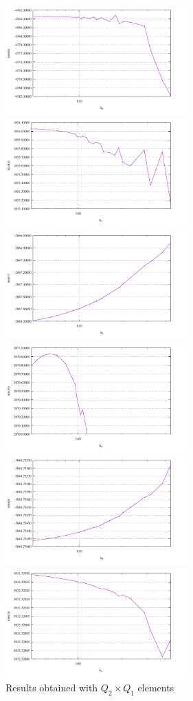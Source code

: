 \begin{center}
\includegraphics[width=7cm]{python_codes/fieldstone_25/results/min_u_001.pdf}
\includegraphics[width=7cm]{python_codes/fieldstone_25/results/max_u_001.pdf}\\
\includegraphics[width=7cm]{python_codes/fieldstone_25/results/min_v_001.pdf}
\includegraphics[width=7cm]{python_codes/fieldstone_25/results/max_v_001.pdf}\\
\includegraphics[width=7cm]{python_codes/fieldstone_25/results/min_p_001.pdf}
\includegraphics[width=7cm]{python_codes/fieldstone_25/results/max_p_001.pdf}\\
{\captionfont Results obtained with $Q_2\times Q_1$ elements} 
\end{center}


